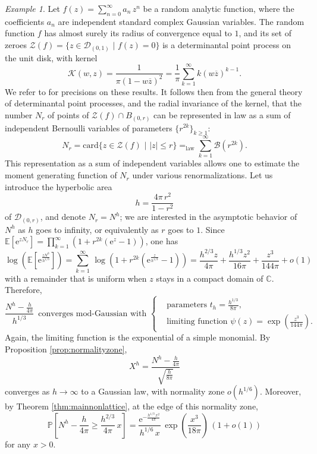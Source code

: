 \documentclass[12pt,a4paper,reqno]{amsart}
\theoremstyle{remark}
\newtheorem{example}[lemma]{Example}
\newcommand{\C}{\mathbb{C}}
\newcommand{\E}{\mathrm{e}}
\newcommand{\esper}{\mathbb{E}}
\newcommand{\proba}{\mathbb{P}}
\begin{document}
\begin{example}
    \label{ex:zeros_randomfunction}
Let $f(z)=\sum_{n=0}^\infty a_n\,z^n$ be a random analytic function, where the coefficients $a_n$ are independent standard complex Gaussian variables. The random function $f$ has almost surely its radius of convergence equal to $1$, and its set of zeroes $\mathcal{Z}(f)=\{z \in \mathcal{D}_{(0,1)}\,\,|\,\,f(z)=0 \}$ is a determinantal point process on the unit disk, with kernel 
$$\mathcal{K}(w,z)=\frac{1}{\pi(1-w\overline{z})^2}=\frac{1}{\pi}\sum_{k=1}^\infty k(w\overline{z})^{k-1}.$$
We refer to \cite{Zero} for precisions on these results. It follows then from the general theory of determinantal point processes, and the radial invariance of the kernel, that the number $N_r$ of points of $\mathcal{Z}(f) \cap B_{(0,r)}$ can be represented in law as a sum of independent Bernoulli variables of parameters $\{r^{2k}\}_{k \geq 1}$:
$$N_r=\mathrm{card}\{z \in \mathcal{Z}(f)\,\,|\,\,|z|\leq r\} =_{\text{law}} \sum_{k=1}^\infty\mathcal{B}(r^{2k}).$$
This representation as a sum of independent variables allows one to estimate the moment generating function of $N_r$ under various renormalizations. Let us introduce the hyperbolic area $$h=\frac{4\pi\,r^2}{1-r^2}$$ of $\mathcal{D}_{(0,r)}$, and denote $N_r=N^h$; we are interested in the asymptotic behavior of $N^h$ as $h$ goes to infinity, or equivalently as $r$ goes to $1$. Since $\esper[\E^{zN_r}]=\prod_{k=1}^\infty (1+r^{2k}(\E^z-1))$, one has
$$
\log \left(\esper\!\left[\E^{\frac{zN^h}{h^{1/3}}}\right]\right)=\sum_{k=1}^\infty \,\log\left(1+r^{2k}\left(\E^\frac{z}{h^{1/3}}-1\right)\right) =\frac{h^{2/3}z}{4\pi}+ \frac{h^{1/3}z^2}{16\pi}+\frac{z^3}{144\pi}+o(1)
$$
with a remainder that is uniform when $z$ stays in a compact domain of $\C$. Therefore, $$\frac{N^h-\frac{h}{4\pi} }{h^{1/3}}\,\text{ converges mod-Gaussian with }\begin{cases} &\!\!\text{parameters } t_h=\frac{h^{1/3}}{8\pi},\\
 &\!\!\text{limiting function }\psi(z)=\exp\left(\frac{z^3}{144\pi}\right). 
 \end{cases}$$
Again, the limiting function is the exponential of a simple monomial. By Proposition \ref{prop:normalityzone}, 
$$X^h = \frac{N^h - \frac{h}{4\pi}}{\sqrt{\frac{h}{8\pi}}}$$
converges as $h \to \infty$ to a Gaussian law, with normality zone $o(h^{1/6})$. Moreover, by Theorem \ref{thm:mainnonlattice}, at the edge of this normality zone,
$$\proba\!\left[N^h - \frac{h}{4\pi} \geq \frac{h^{2/3}}{4\pi}\,x\right] = \frac{\E^{-\frac{h^{1/3}\,x^2}{4\pi}}}{h^{1/6}\,x}\,\exp\left(\frac{x^3}{18\pi}\right)\,(1+o(1))$$
for any $x>0$.
\end{example}
\medskip
\end{document}
